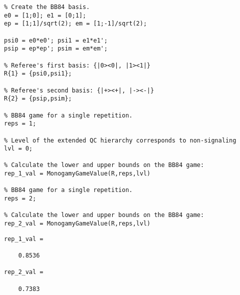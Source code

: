\begin{verbatim}
% Create the BB84 basis.
e0 = [1;0]; e1 = [0;1];
ep = [1;1]/sqrt(2); em = [1;-1]/sqrt(2); 

psi0 = e0*e0'; psi1 = e1*e1';
psip = ep*ep'; psim = em*em'; 

% Referee's first basis: {|0><0|, |1><1|}
R{1} = {psi0,psi1};

% Referee's second basis: {|+><+|, |-><-|}
R{2} = {psip,psim};

% BB84 game for a single repetition.
reps = 1; 

% Level of the extended QC hierarchy corresponds to non-signaling 
lvl = 0;

% Calculate the lower and upper bounds on the BB84 game:
rep_1_val = MonogamyGameValue(R,reps,lvl)

% BB84 game for a single repetition.
reps = 2; 

% Calculate the lower and upper bounds on the BB84 game:
rep_2_val = MonogamyGameValue(R,reps,lvl)
\end{verbatim}
\color{lightgray} 
\begin{verbatim}     
rep_1_val =

    0.8536

rep_2_val =

    0.7383
\end{verbatim}
\color{black}